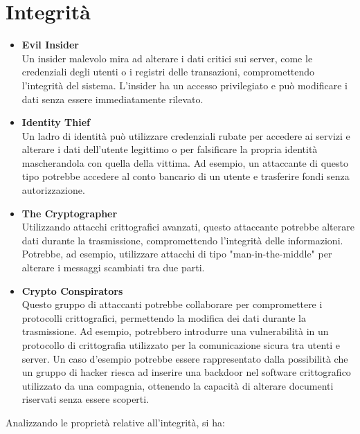     \section{Integrità}
        \begin{itemize}
            \item \textbf{Evil Insider} \\
                Un insider malevolo mira ad alterare i dati critici sui server, come le credenziali degli utenti o i registri delle transazioni, compromettendo l'integrità del sistema.
                L'insider ha un accesso privilegiato e può modificare i dati senza essere immediatamente rilevato.

            \item \textbf{Identity Thief} \\
                Un ladro di identità può utilizzare credenziali rubate per accedere ai servizi e alterare i dati dell'utente legittimo o per falsificare la propria identità mascherandola con quella della vittima.
                Ad esempio, un attaccante di questo tipo potrebbe accedere al conto bancario di un utente e trasferire fondi senza autorizzazione.

            \item \textbf{The Cryptographer} \\
                Utilizzando attacchi crittografici avanzati, questo attaccante potrebbe alterare dati durante la trasmissione, compromettendo l'integrità delle informazioni.
                Potrebbe, ad esempio, utilizzare attacchi di tipo "man-in-the-middle" per alterare i messaggi scambiati tra due parti.

            \item \textbf{Crypto Conspirators} \\
                Questo gruppo di attaccanti potrebbe collaborare per compromettere i protocolli crittografici, permettendo la modifica dei dati durante la trasmissione. 
                Ad esempio, potrebbero introdurre una vulnerabilità in un protocollo di crittografia utilizzato per la comunicazione sicura tra utenti e server.
                Un caso d'esempio potrebbe essere rappresentato dalla possibilità che un gruppo di hacker riesca ad inserire una backdoor nel software crittografico utilizzato da una compagnia, ottenendo la capacità di alterare documenti riservati senza essere scoperti.
        \end{itemize}

        \noindent Analizzando le proprietà relative all'integrità, si ha:
        
